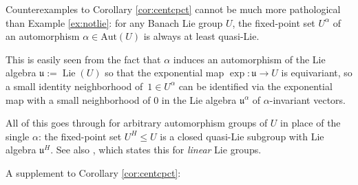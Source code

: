 \documentclass[pdftex]{sigma}
\numberwithin{equation}{section}
\newcommand\fu{{\mathfrak u}}
\begin{document}
\begin{Remark}\label{re:centnotbad}
 Counterexamples to Corollary \ref{cor:centcpct} cannot be much more pathological than Example \ref{ex:notlie}: for any Banach Lie group $U$, the fixed-point set $U^{\alpha}$ of an automorphism ${\alpha\in \mathrm{Aut}(U)}$ is always at least quasi-Lie.

 This is easily seen from the fact that $\alpha$ induces an automorphism of the Lie algebra ${\fu\!:=\!\operatorname{Lie}(U)}$ so that the exponential map $\exp\colon\fu\to U$ is equivariant, so a small identity neighborhood of~$1\in U^{\alpha}$ can be identified via the exponential map with a small neighborhood of $0$ in the Lie algebra $\fu^{\alpha}$ of $\alpha$-invariant vectors.

 All of this goes through for arbitrary automorphism groups of $U$ in place of the single $\alpha$: the fixed-point set $U^H\le U$ is a closed quasi-Lie subgroup with Lie algebra $\fu^H$. See also \cite[Proposition 5.54\,(ii)]{hm4}, which states this for {\it linear} Lie groups.
\end{Remark}

A supplement to Corollary \ref{cor:centcpct}:
\end{document}

